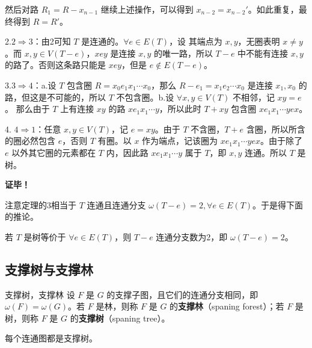 然后对路 $R_1=R-x_{n-1}$ 继续上述操作，可以得到 $x_{n-2}=x_{n-2}'$。如此重复，最终得到 $R=R'$。

2.$2\Rightarrow 3$：由2可知 $T$ 是连通的。$\forall e\in E(T)$，设 其端点为 $x,y$，无圈表明 $x\neq y$。而 $x,y\in V(T-e)$，$xey$ 是连接 $x,y$ 的唯一路，所以 $T-e$ 中不能有连接 $x,y$ 的路了。否则这条路只能是 $xey$，但是 $e\not\in E(T-e)$。

3.$3\Rightarrow 4$：a.设 $T$ 包含圈 $R=x_0e_1x_1\cdots x_0$，那么 $R-e_1=x_1e_2\cdots x_0$ 是连接 $x_1,x_0$ 的路，但这是不可能的，所以 $T$ 不包含圈。b.设 $\forall x,y\in V(T)$ 不相邻，记 $xy=e$。 那么由于 $T$ 上有连接 $xy$ 的路 $xe_1x_1\cdots y$，所以此时 $T+xy$ 包含圈 $xe_1x_1\cdots yex$。 

4. $4\Rightarrow 1$：任意 $x,y\in V(T)$，记 $e=xy$。由于 $T$ 不含圈，$T+e$ 含圈，所以所含的圈必然包含 $e$，否则 $T$ 有圈。以 $x$ 作为端点，记该圈为 $xe_1x_1\cdots yex$。由于除了 $e$ 以外其它圈的元素都在 $T$ 内，因此路 $x e_1x_1\cdots y$ 属于 $T$，即 $x,y$ 连通。所以 $T$ 是树。 

\textbf{证毕！}

注意定理的3相当于 $T$ 连通且连通分支 $\omega(T-e)=2,\forall e\in E(T)$。于是得下面的推论。
\begin{corollary}{}
若 $T$ 是树等价于 $\forall e\in E(T)$，则 $T-e$ 连通分支数为2，即 $\omega(T-e)=2$。
\end{corollary}



\subsection{支撑树与支撑林}

\begin{definition}{支撑树，支撑林}
设 $F$ 是 $G$ 的支撑子图，且它们的连通分支相同，即 $\omega(F)=\omega(G)$。若 $F$ 是林，则称 $F$ 是 $G$ 的\textbf{支撑林}（spaning forest）；若 $F$ 是树，则称 $F$ 是 $G$ 的\textbf{支撑树}（spaning tree）。
\end{definition}

\begin{theorem}{}
每个连通图都是支撑树。
\end{theorem}


















